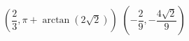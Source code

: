 { $\left( \dfrac{2}{3}, \pi + \arctan\left(2\sqrt{2}\right) \right)$}
{ $\left( -\dfrac{2}{9},  -\dfrac{4\sqrt{2}}{9} \right)$}
